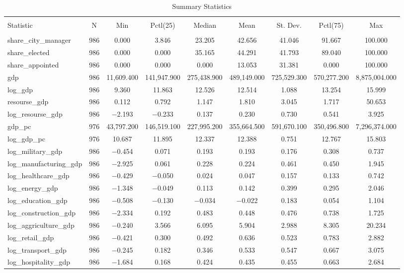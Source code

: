\documentclass[12pt]{article}
\numberwithin{equation}{section}
\numberwithin{table}{section}
\numberwithin{figure}{section}
\begin{document}
\begin{table} \centering \footnotesize
  \caption{Summary Statistics} 
  \label{tab:summary_stat} 
\begin{tabular}{@{\extracolsep{5pt}}lcccccccc} 
\\[-1.8ex]\hline 
\hline \\[-1.8ex] 
Statistic & \multicolumn{1}{c}{N} & \multicolumn{1}{c}{Min} & \multicolumn{1}{c}{Pctl(25)} & \multicolumn{1}{c}{Median} & \multicolumn{1}{c}{Mean} & \multicolumn{1}{c}{St. Dev.} & \multicolumn{1}{c}{Pctl(75)} & \multicolumn{1}{c}{Max} \\ 
\hline \\[-1.8ex] 
share\_city\_manager & 986 & 0.000 & 3.846 & 23.205 & 42.656 & 41.046 & 91.667 & 100.000 \\ 
share\_elected & 986 & 0.000 & 0.000 & 35.165 & 44.291 & 41.793 & 89.040 & 100.000 \\ 
share\_appointed & 986 & 0.000 & 0.000 & 0.000 & 13.053 & 31.381 & 0.000 & 100.000 \\ 
gdp & 986 & 11,609.400 & 141,947.900 & 275,438.900 & 489,149.000 & 725,529.300 & 570,277.200 & 8,875,004.000 \\ 
log\_gdp & 986 & 9.360 & 11.863 & 12.526 & 12.514 & 1.088 & 13.254 & 15.999 \\ 
resourse\_gdp & 986 & 0.112 & 0.792 & 1.147 & 1.810 & 3.045 & 1.717 & 50.653 \\ 
log\_resourse\_gdp & 986 & $-$2.193 & $-$0.233 & 0.137 & 0.230 & 0.730 & 0.541 & 3.925 \\ 
gdp\_pc & 976 & 43,797.200 & 146,519.100 & 227,995.200 & 355,664.500 & 591,670.100 & 350,496.800 & 7,296,374.000 \\ 
log\_gdp\_pc & 976 & 10.687 & 11.895 & 12.337 & 12.388 & 0.751 & 12.767 & 15.803 \\ 
log\_military\_gdp & 986 & $-$0.454 & 0.071 & 0.193 & 0.193 & 0.176 & 0.308 & 0.737 \\ 
log\_manufacturing\_gdp & 986 & $-$2.925 & 0.061 & 0.228 & 0.224 & 0.461 & 0.450 & 1.945 \\ 
log\_healthcare\_gdp & 986 & $-$0.429 & $-$0.050 & 0.024 & 0.047 & 0.157 & 0.133 & 0.742 \\ 
log\_energy\_gdp & 986 & $-$1.348 & $-$0.049 & 0.113 & 0.142 & 0.399 & 0.295 & 2.046 \\ 
log\_education\_gdp & 986 & $-$0.508 & $-$0.130 & $-$0.034 & $-$0.022 & 0.183 & 0.054 & 1.104 \\ 
log\_construction\_gdp & 986 & $-$2.334 & 0.192 & 0.483 & 0.448 & 0.476 & 0.738 & 1.725 \\ 
log\_aggriculture\_gdp & 986 & $-$0.240 & 3.566 & 6.095 & 5.904 & 2.988 & 8.305 & 20.234 \\ 
log\_retail\_gdp & 986 & $-$0.421 & 0.300 & 0.492 & 0.636 & 0.523 & 0.783 & 2.882 \\ 
log\_transport\_gdp & 986 & $-$0.245 & 0.182 & 0.346 & 0.533 & 0.547 & 0.667 & 3.075 \\ 
log\_hospitality\_gdp & 986 & $-$1.684 & 0.168 & 0.424 & 0.435 & 0.455 & 0.663 & 2.684 \\ 


\end{tabular}
\end{table}
\end{document}
